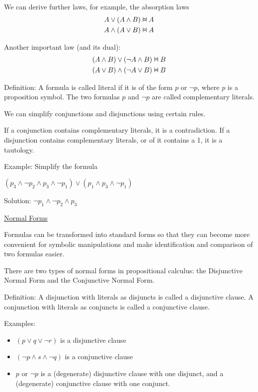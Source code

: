 \documentclass{article}
\newcommand{\vDashv}{%
  \mathrel{%
    \text{%
      \ooalign{$\vDash$\cr\reflectbox{$\vDash$}\cr}%
    }%
  }%
}
\begin{document}
We can derive further laws, for example, the absorption laws
\begin{align*}
A \vee (A \wedge B) &\vDashv A \\
A \wedge (A \vee B) &\vDashv A
\end{align*}

Another important law (and its dual):
\begin{align*}
(A \wedge B) \vee (\neg A \wedge B) &\vDashv B \\
(A \vee B) \wedge (\neg A \vee B) &\vDashv B
\end{align*}

Definition: A formula is called literal if it is of the form $p$ or $\neg p$, where $p$ is a proposition symbol. The two formulas $p$ and $\neg p$ are called complementary literals. 

We can simplify conjunctions and disjunctions using certain rules. 

If a conjunction contains complementary literals, it is a contradiction. If a disjunction contains complementary literals, or of it contains a 1, it is a tautology.

Example: Simplify the formula

$(p_3 \wedge \neg p_2 \wedge p_3 \wedge \neg p_1) \vee (p_1 \wedge p_3 \wedge \neg p_1)$

Solution: $\neg p_1 \wedge \neg p_2 \wedge p_3$

\underline{Normal Forms}

Formulas can be transformed into standard forms so that they can become more convenient for symbolic manipulations and make identification and comparison of two formulas easier. 

There are two types of normal forms in propositional calculus: the Disjunctive Normal Form and the Conjunctive Normal Form.

Definition: A disjunction with literals as disjuncts is called a disjunctive clause. A conjunction with literals as conjuncts is called a conjunctive clause. 

Examples:

\begin{itemize}
    \item $(p \vee q \vee \neg r)$ is a disjunctive clause
    \item $(\neg p \wedge s \wedge \neg q)$ is a conjunctive clause
    \item $p$ or $\neg p$ is a (degenerate) disjunctive clause with one disjunct, and a (degenerate) conjunctive clause with one conjunct. 
\end{itemize}
\end{document}
